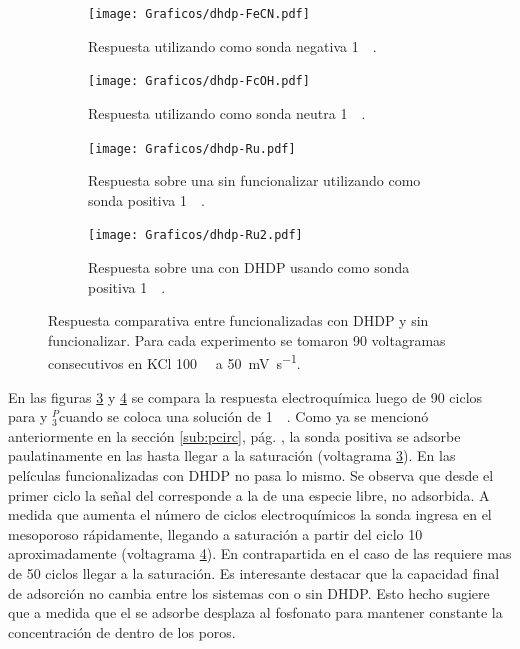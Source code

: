 		    	\begin{figure}[b!]	
					\begin{subfigure}[t]{0.495\textwidth}
			 	    \texttt{[image: Graficos/dhdp-FeCN.pdf]}
			        \caption{Respuesta utilizando como sonda negativa \ferroferri\space \SI{1}{\milli\Molar}.}
			        \vspace*{4mm}
			        \label{fig:dhdp-vc-fe}
			        \end{subfigure}
			         \begin{subfigure}[t]{0.495\textwidth}
			 	    \texttt{[image: Graficos/dhdp-FcOH.pdf]}
			        \caption{Respuesta utilizando como sonda neutra \fc\space \SI{1}{\milli\Molar}.}
			        \vspace*{4mm}
			        \label{fig:dhdp-vc-fc}
			        \end{subfigure}
			        \begin{subfigure}[t]{0.495\textwidth}
			 	    \texttt{[image: Graficos/dhdp-Ru.pdf]}
			        \caption{Respuesta sobre una \pdmZ\space sin funcionalizar utilizando como sonda positiva \aminorutenio\space \SI{1}{\milli\Molar}.}
			        \label{fig:dhdp-vc-ru}
			        \end{subfigure}
			        \begin{subfigure}[t]{0.495\textwidth}
			 	    \texttt{[image: Graficos/dhdp-Ru2.pdf]}
			        \caption{Respuesta sobre una \pdmZ\space con DHDP usando como sonda positiva \aminorutenio\space \SI{1}{\milli\Molar}.}
			        \label{fig:dhdp-vc-ru2}
			        \end{subfigure}
			        \caption[Voltagramas de \pdmZ$^P_3$ con \aminorutenio, \fc\space y \ferroferri]{Respuesta comparativa entre \pdmZ\space funcionalizadas con DHDP y sin funcionalizar. Para cada experimento se tomaron 90 voltagramas consecutivos en KCl \SI{100}{\milli\Molar} a \SI{50}{\milli\volt\per\second}.}
			        \label{fig:dhdp-vc}
			      	\end{figure}

		    \pagebreak En las figuras \ref{fig:dhdp-vc-ru} y \ref{fig:dhdp-vc-ru2} se compara la respuesta electroquímica luego de 90 ciclos para \pdmZ\space y \pdmZ$^P_3$\space cuando se coloca una solución de \ru\space \SI{1}{\milli\Molar}. Como ya se mencionó anteriormente en la sección \ref{sub:pcirc}, pág. \pageref{sub:pcirc}, la sonda positiva se adsorbe paulatinamente en las \pdmZ\space hasta llegar a la saturación (voltagrama \ref{fig:dhdp-vc-ru}). En las películas funcionalizadas con DHDP no pasa lo mismo. Se observa que desde el primer ciclo la señal del \ru\space corresponde a la de una especie libre, no adsorbida. A medida que aumenta el número de ciclos electroquímicos la sonda ingresa en el mesoporoso rápidamente, llegando a saturación a partir del ciclo 10 aproximadamente (voltagrama \ref{fig:dhdp-vc-ru2}). En contrapartida en el caso de las \pdmZ\space requiere mas de 50 ciclos llegar a la saturación. Es interesante destacar que la capacidad final de adsorción no cambia entre los sistemas con o sin DHDP. Esto hecho sugiere que a medida que el \ru\space se adsorbe desplaza al fosfonato para mantener constante la concentración de \ru\space dentro de los poros.

